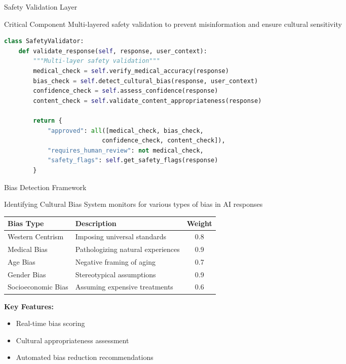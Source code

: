 \documentclass[aspectratio=169]{beamer}
\begin{document}
\begin{frame}[fragile]{Safety Validation Layer}
    \begin{alertblock}{Critical Component}
        Multi-layered safety validation to prevent misinformation and ensure cultural sensitivity
    \end{alertblock}
    
    \begin{lstlisting}[language=Python, caption=Safety Validator]
class SafetyValidator:
    def validate_response(self, response, user_context):
        """Multi-layer safety validation"""
        medical_check = self.verify_medical_accuracy(response)
        bias_check = self.detect_cultural_bias(response, user_context)
        confidence_check = self.assess_confidence(response)
        content_check = self.validate_content_appropriateness(response)
        
        return {
            "approved": all([medical_check, bias_check, 
                           confidence_check, content_check]),
            "requires_human_review": not medical_check,
            "safety_flags": self.get_safety_flags(response)
        }
    \end{lstlisting}
\end{frame}

\begin{frame}{Bias Detection Framework}
    \begin{block}{Identifying Cultural Bias}
        System monitors for various types of bias in AI responses
    \end{block}
    
    \begin{table}
        \centering
        \footnotesize
        \begin{tabular}{|l|l|c|}
            \hline
            \textbf{Bias Type} & \textbf{Description} & \textbf{Weight} \\
            \hline
            Western Centrism & Imposing universal standards & 0.8 \\
            Medical Bias & Pathologizing natural experiences & 0.9 \\
            Age Bias & Negative framing of aging & 0.7 \\
            Gender Bias & Stereotypical assumptions & 0.9 \\
            Socioeconomic Bias & Assuming expensive treatments & 0.6 \\
            \hline
        \end{tabular}
    \end{table}
    
    \textbf{Key Features:}
    \begin{itemize}
        \item Real-time bias scoring
        \item Cultural appropriateness assessment
        \item Automated bias reduction recommendations
    \end{itemize}
\end{frame}
\end{document}
